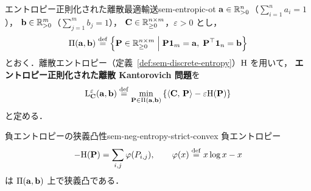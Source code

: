 \begin{definition}{エントロピー正則化された離散最適輸送}{sem-entropic-ot}
  $\mathbf{a} \in \mathbb{R}_{>0}^n$（$\sum_{i=1}^n a_i = 1$），
  $\mathbf{b} \in \mathbb{R}_{>0}^m$（$\sum_{j=1}^m b_j = 1$），
  $\mathbf{C} \in \mathbb{R}_{\geq 0}^{n \times m}$，$\varepsilon > 0$ とし，
  \[
    \Pi(\mathbf{a}, \mathbf{b})
    \overset{\mathrm{def}}{=}
    \left\{
      \mathbf{P} \in \mathbb{R}_{\geq 0}^{n \times m}
      \;\middle|\;
      \mathbf{P}\mathbf{1}_m = \mathbf{a},\;
      \mathbf{P}^\top\mathbf{1}_n = \mathbf{b}
    \right\}
  \]
  とおく．離散エントロピー（定義~\ref{def:sem-discrete-entropy}）$\mathrm{H}$ を用いて，
  \textbf{エントロピー正則化された離散 Kantorovich 問題}を
  \[
    \mathrm{L}_{\mathbf{C}}^\varepsilon(\mathbf{a}, \mathbf{b})
    \overset{\mathrm{def}}{=}
    \min_{\mathbf{P} \in \Pi(\mathbf{a}, \mathbf{b})}
    \left\{
      \langle \mathbf{C},\, \mathbf{P} \rangle
      - \varepsilon \mathrm{H}(\mathbf{P})
    \right\}
  \]
  と定める．
\end{definition}

\begin{claim}{負エントロピーの狭義凸性}{sem-neg-entropy-strict-convex}
  負エントロピー
  \[
    -\mathrm{H}(\mathbf{P}) = \sum_{i,j}\varphi(P_{i,j}),
    \qquad \varphi(x) \overset{\mathrm{def}}{=} x\log x - x
  \]
  は $\Pi(\mathbf{a}, \mathbf{b})$ 上で狭義凸である．
\end{claim}

